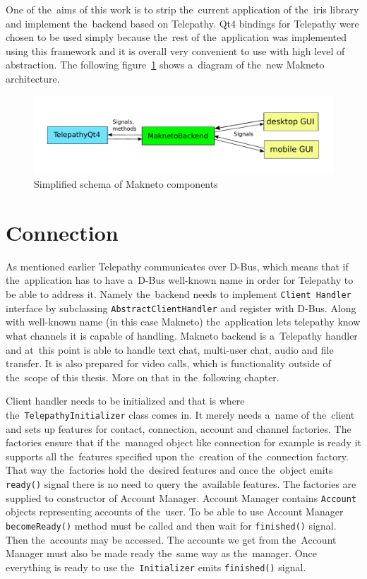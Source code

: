 One of the~aims of this work is to strip the~current application of the~iris library and implement the~backend based on Telepathy. Qt4 bindings for Telepathy were chosen to be used simply because the~rest of the~application was implemented using this framework and it is overall very convenient to use with high level of abstraction. The following figure~\ref{fig:MaknetoArchitectureDiagram} shows a~diagram of the~new Makneto architecture. 

\begin{figure}[ht]
	\begin{center}
	\includegraphics[width=15cm]{fig/maknetoArchitecture}
	\caption{Simplified schema of Makneto components}
	\label{fig:MaknetoArchitectureDiagram}
\end{center}
\end{figure}

\section{Connection}
As mentioned earlier Telepathy communicates over D-Bus, which means that if the~application has to have a~D-Bus well-known name in order for Telepathy to be able to address it.	Namely the~backend needs to implement \verb|Client Handler| interface by subclassing \verb|AbstractClientHandler| and register with D-Bus. Along with well-known name (in this case Makneto) the~application lets telepathy know what channels it is capable of handling. Makneto backend is a~Telepathy handler and at~this point is able to handle text chat, multi-user chat, audio and file transfer. It is also prepared for video calls, which is functionality outside of the~scope of this thesis. More on that in the~following chapter. 

Client handler needs to be initialized and that is where the~\verb|TelepathyInitializer| class comes in. It merely needs a~name of the~client and sets up features for contact, connection, account and channel factories. The factories ensure that if the~managed object like connection for example is ready it supports all the~features specified upon the~creation of the~connection factory. That way the~factories hold the~desired features and once the~object emits \verb|ready()| signal there is no need to query the~available features. The factories are supplied to constructor of Account Manager. Account Manager contains \verb|Account| objects representing accounts of the~user. To be able to use Account Manager \verb|becomeReady()| method must be called and then wait for \verb|finished()| signal. Then the~accounts may be accessed. The accounts we get from the~Account Manager must also be made ready the~same way as the~manager. Once everything is ready to use the~\verb|Initializer| emits \verb|finished()| signal. 

